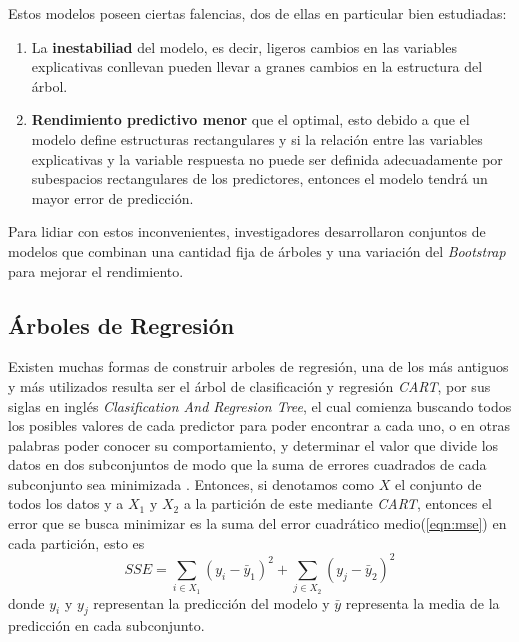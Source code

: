 Estos modelos poseen ciertas falencias, dos de ellas en particular bien estudiadas:
\begin{enumerate}
    \item La \textbf{inestabiliad} del modelo, es decir, ligeros cambios en las variables explicativas conllevan
          pueden llevar a granes cambios en la estructura del árbol.
    \item \textbf{Rendimiento predictivo menor} que el optimal, esto debido a que el modelo define estructuras rectangulares y si 
          la relación entre las variables explicativas y la variable respuesta no puede ser definida adecuadamente por
          subespacios rectangulares de los predictores, entonces el modelo tendrá un mayor error de predicción.
\end{enumerate} 


Para lidiar con estos inconvenientes, investigadores desarrollaron conjuntos de modelos que combinan una cantidad fija de árboles
y una variación del \textit{Bootstrap} para mejorar el rendimiento.

    \subsection{Árboles de Regresión}
    Existen muchas formas de construir arboles de regresión, una de los más antiguos y más utilizados
    resulta ser el árbol de clasificación y regresión \textit{CART}, por sus siglas en inglés 
    \textit{Clasification And Regresion Tree}, el cual comienza buscando todos los posibles valores de cada predictor para poder encontrar a cada uno,
    o en otras palabras poder conocer su comportamiento, y determinar el valor que divide los datos en dos subconjuntos de modo que la suma de errores 
    cuadrados de cada subconjunto sea minimizada \cite{18}. Entonces, si denotamos como $X$ el conjunto de todos los datos y a $X_1 \text{ y } X_2$ a la
    partición de este mediante \textit{CART}, entonces el error que se busca minimizar es la suma del error cuadrático medio(\ref{eqn:mse}) en cada partición, esto es
    \begin{equation*} 
        SSE = \sum_{i\in X_1}(y_i-\bar{y}_1)^2+ \sum_{j\in X_2}(y_j-\bar{y}_2)^2
    \end{equation*}
    donde $y_i$ y $y_j$ representan la predicción del modelo y $\bar{y}$ representa la media de la predicción en cada subconjunto.

